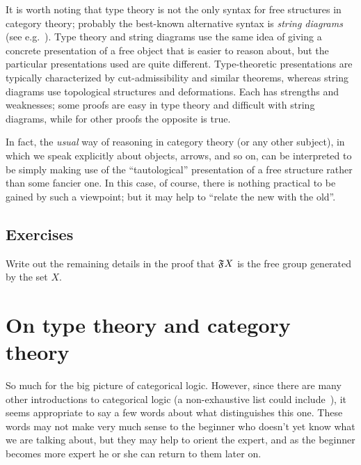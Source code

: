 \begin{rmk}
  It is worth noting that type theory is not the only syntax for free structures in category theory; probably the best-known alternative syntax is \emph{string diagrams} (see e.g.~\cite{js:geom-tenscalc-i,selinger:graphical}).
  Type theory and string diagrams use the same idea of giving a concrete presentation of a free object that is easier to reason about, but the particular presentations used are quite different.
  Type-theoretic presentations are typically characterized by cut-admissibility and similar theorems, whereas string diagrams use topological structures and deformations.
  Each has strengths and weaknesses; some proofs are easy in type theory and difficult with string diagrams, while for other proofs the opposite is true.

  In fact, the \emph{usual} way of reasoning in category theory (or any other subject), in which we speak explicitly about objects, arrows, and so on, can be interpreted to be simply making use of the ``tautological'' presentation of a free structure rather than some fancier one.
  In this case, of course, there is nothing practical to be gained by such a viewpoint; but it may help to ``relate the new with the old''.
\end{rmk}


\subsection*{Exercises}

\begin{ex}\label{ex:group-cutadm}
  Write out the remaining details in the proof that $\mathfrak{F}_{}X$ is the free group generated by the set $X$.
\end{ex}


\section{On type theory and category theory}
\label{sec:generalities}

So much for the big picture of categorical logic.
However, since there are many other introductions to categorical logic (a non-exhaustive list could include~\cite{mr:focl,ls:hocl,jacobs:cltt,goldblatt:topoi,ptj:elephant}), it seems appropriate to say a few words about what distinguishes this one.
These words may not make very much sense to the beginner who doesn't yet know what we are talking about, but they may help to orient the expert, and as the beginner becomes more expert he or she can return to them later on.

